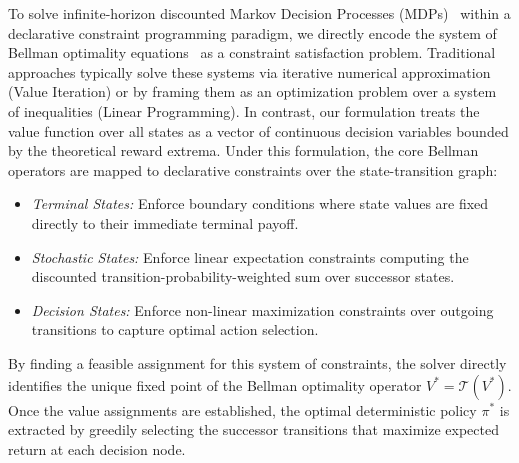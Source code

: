 \documentclass{article}
\begin{document}
To solve infinite-horizon discounted Markov Decision Processes (MDPs)~\cite{Puterman:1994Markov} within a declarative constraint programming paradigm, we directly encode the system of Bellman optimality equations~\cite{Bellman:1957:dynamic} as a constraint satisfaction problem. Traditional approaches typically solve these systems via iterative numerical approximation (Value Iteration) or by framing them as an optimization problem over a system of inequalities (Linear Programming). In contrast, our formulation treats the value function over all states as a vector of continuous decision variables bounded by the theoretical reward extrema. Under this formulation, the core Bellman operators are mapped to declarative constraints over the state-transition graph:
\begin{itemize}
    \item \textit{Terminal States:} Enforce boundary conditions where state values are fixed directly to their immediate terminal payoff.
    \item \textit{Stochastic States:} Enforce linear expectation constraints computing the discounted transition-probability-weighted sum over successor states.
    \item \textit{Decision States:} Enforce non-linear maximization constraints over outgoing transitions to capture optimal action selection.
\end{itemize}
By finding a feasible assignment for this system of constraints, the solver directly identifies the unique fixed point of the Bellman optimality operator $V^* = \mathcal{T}(V^*)$. Once the value assignments are established, the optimal deterministic policy $\pi^*$ is extracted by greedily selecting the successor transitions that maximize expected return at each decision node.
\end{document}
